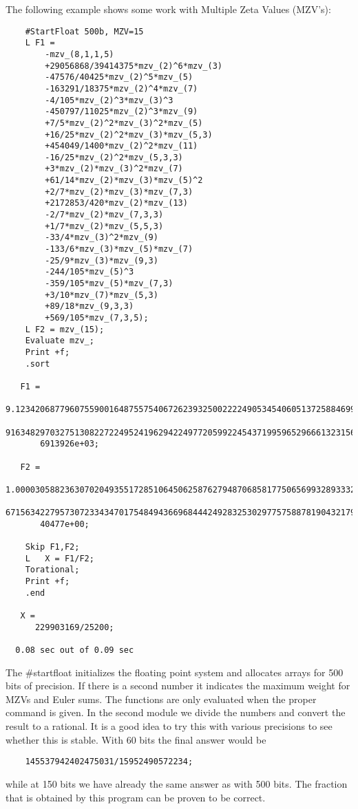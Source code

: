 The following example shows some work with Multiple Zeta Values (MZV's):
\begin{verbatim}
    #StartFloat 500b, MZV=15
    L F1 =
    	-mzv_(8,1,1,5)
    	+29056868/39414375*mzv_(2)^6*mzv_(3)
    	-47576/40425*mzv_(2)^5*mzv_(5)
    	-163291/18375*mzv_(2)^4*mzv_(7)
    	-4/105*mzv_(2)^3*mzv_(3)^3
    	-450797/11025*mzv_(2)^3*mzv_(9)
    	+7/5*mzv_(2)^2*mzv_(3)^2*mzv_(5)
    	+16/25*mzv_(2)^2*mzv_(3)*mzv_(5,3)
    	+454049/1400*mzv_(2)^2*mzv_(11)
    	-16/25*mzv_(2)^2*mzv_(5,3,3)
    	+3*mzv_(2)*mzv_(3)^2*mzv_(7)
    	+61/14*mzv_(2)*mzv_(3)*mzv_(5)^2
    	+2/7*mzv_(2)*mzv_(3)*mzv_(7,3)
    	+2172853/420*mzv_(2)*mzv_(13)
    	-2/7*mzv_(2)*mzv_(7,3,3)
    	+1/7*mzv_(2)*mzv_(5,5,3)
    	-33/4*mzv_(3)^2*mzv_(9)
    	-133/6*mzv_(3)*mzv_(5)*mzv_(7)
    	-25/9*mzv_(3)*mzv_(9,3)
    	-244/105*mzv_(5)^3
    	-359/105*mzv_(5)*mzv_(7,3)
    	+3/10*mzv_(7)*mzv_(5,3)
    	+89/18*mzv_(9,3,3)
    	+569/105*mzv_(7,3,5);
    L F2 = mzv_(15);
    Evaluate mzv_;
    Print +f;
    .sort

   F1 =
       9.1234206877960755900164875575406726239325002222490534540605137258846994\
       916348297032751308227224952419629422497720599224543719959652966613231560\
       6913926e+03;

   F2 =
       1.0000305882363070204935517285106450625876279487068581775065699328933322\
       671563422795730723343470175484943669684442492832530297757588781904321794\
       40477e+00;

    Skip F1,F2;
    L	X = F1/F2;
    Torational;
    Print +f;
    .end

   X =
      229903169/25200;

  0.08 sec out of 0.09 sec
\end{verbatim}
The \#startfloat initializes the floating point system and allocates arrays 
for 500 bits of precision. If there is a second number it indicates the 
maximum weight for MZVs and Euler sums. The functions are only evaluated 
when the proper command is given. In the second module we divide the 
numbers and convert the result to a rational. It is a good idea to try this 
with various precisions to see whether this is stable. With 60 bits the 
final answer would be
\begin{verbatim}
    145537942402475031/15952490572234;
\end{verbatim}
while at 150 bits we have already the same answer as with 500 bits. The 
fraction that is obtained by this program can be proven to be correct.
\vspace{3mm}

